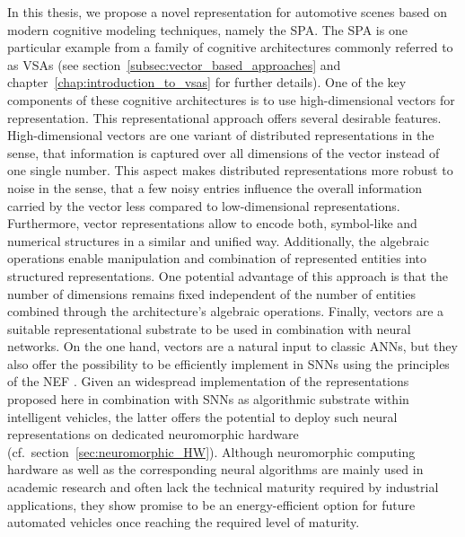 In this thesis, we propose a novel representation for automotive scenes based on modern cognitive modeling techniques, namely the \ac{SPA}.
The \ac{SPA} is one particular example from a family of cognitive architectures commonly referred to as \acp{VSA} (see section~\ref{subsec:vector_based_approaches} and chapter~\ref{chap:introduction_to_vsas} for further details).
One of the key components of these cognitive architectures is to use high-dimensional vectors for representation.
This representational approach offers several desirable features.
High-dimensional vectors are one variant of distributed representations in the sense, that information is captured over all dimensions of the vector instead of one single number.
This aspect makes distributed representations more robust to noise in the sense, that a few noisy entries influence the overall information carried by the vector less compared to low-dimensional representations.
Furthermore, vector representations allow to encode both, symbol-like and numerical structures in a similar and unified way.
Additionally, the algebraic operations enable manipulation and combination of represented entities into structured representations.
One potential advantage of this approach is that the number of dimensions remains fixed independent of the number of entities combined through the architecture's algebraic operations.
Finally, vectors are a suitable representational substrate to be used in combination with neural networks.
On the one hand, vectors are a natural input to classic \acp{ANN}, but they also offer the possibility to be efficiently implement in \acp{SNN} using the principles of the \ac{NEF} \parencite[see][but also section~\ref{subsec:implementation_in_snns}]{Eliasmith2013}.
Given an widespread implementation of the representations proposed here in combination with \acp{SNN} as algorithmic substrate within intelligent vehicles, the latter offers the potential to deploy such neural representations on dedicated neuromorphic hardware (cf.\ section~\ref{sec:neuromorphic_HW}).
Although neuromorphic computing hardware as well as the corresponding neural algorithms are mainly used in academic research and often lack the technical maturity required by industrial applications, they show promise to be an energy-efficient option for future automated vehicles once reaching the required level of maturity.

